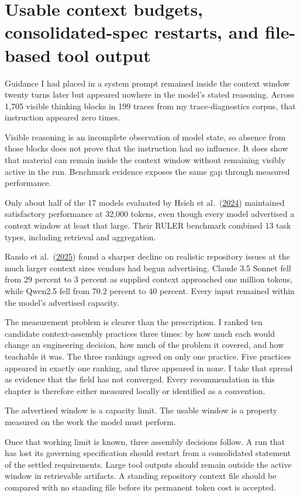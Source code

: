 \chapter{Usable context budgets, consolidated-spec restarts, and file-based tool output}
\label{ch13-usable-context-budgets-spec-restarts-file-output}
Guidance I had placed in a system prompt remained inside the context window twenty turns later but appeared nowhere in the model's stated reasoning. Across 1,705 visible thinking blocks in 199 traces from my trace-diagnostics corpus, that instruction appeared zero times.

Visible reasoning is an incomplete observation of model state, so absence from those blocks does not prove that the instruction had no influence. It does show that material can remain inside the context window without remaining visibly active in the run. Benchmark evidence exposes the same gap through measured performance.

Only about half of the 17 models evaluated by Hsieh et al.~(\href{https://arxiv.org/abs/2404.06654}{2024}) maintained satisfactory performance at 32,000 tokens, even though every model advertised a context window at least that large. Their RULER benchmark combined 13 task types, including retrieval and aggregation.

Rando et al.~(\href{https://arxiv.org/abs/2505.07897}{2025}) found a sharper decline on realistic repository issues at the much larger context sizes vendors had begun advertising. Claude 3.5 Sonnet fell from 29 percent to 3 percent as supplied context approached one million tokens, while Qwen2.5 fell from 70.2 percent to 40 percent. Every input remained within the model's advertised capacity.

The measurement problem is clearer than the prescription. I ranked ten candidate context-assembly practices three times: by how much each would change an engineering decision, how much of the problem it covered, and how teachable it was. The three rankings agreed on only one practice. Five practices appeared in exactly one ranking, and three appeared in none. I take that spread as evidence that the field has not converged. Every recommendation in this chapter is therefore either measured locally or identified as a convention.

The advertised window is a capacity limit. The usable window is a property measured on the work the model must perform.

Once that working limit is known, three assembly decisions follow. A run that has lost its governing specification should restart from a consolidated statement of the settled requirements. Large tool outputs should remain outside the active window in retrievable artifacts. A standing repository context file should be compared with no standing file before its permanent token cost is accepted.

